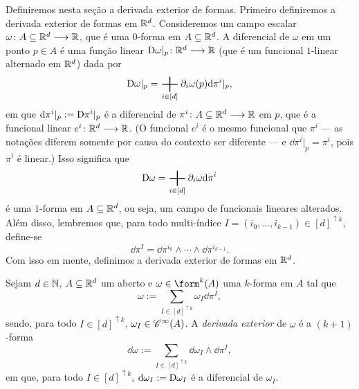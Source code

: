Definiremos nesta seção a derivada exterior de formas. Primeiro definiremos a derivada exterior de formas em $\mathbb{R}^d$. Consideremos um campo escalar $\omega\colon A \subseteq \mathbb{R}^d \longrightarrow \mathbb{R}$, que é uma $0$-forma em $A \subseteq \mathbb{R}^d$. A diferencial de $\omega$ em um ponto $p \in A$ é uma função linear $\mathrm{D} \omega|_p\colon \mathbb{R}^d \longrightarrow \mathbb{R}$ (que é um funcional $1$-linear alternado em $\mathbb{R}^d$) dada por
	\begin{equation*}
	\D \omega|_p = \sum_{i \in [d]} \partial_i \omega(p) \dd\pi^i|_p,
	\end{equation*}
em que $\mathrm{d}\pi^i|_p := \mathrm{D}\pi^i|_p$ é a diferencial de $\pi^i\colon A \subseteq \mathbb{R}^d \longrightarrow \mathbb{R}$ em $p$, que é a funcional linear $e^i\colon \mathbb{R}^d \longrightarrow \mathbb{R}$. (O funcional $e^i$ é o mesmo funcional que $\pi^i$ --- as notações diferem somente por causa do contexto ser diferente --- e $\dd\pi^i|_p=\pi^i$, pois $\pi^i$ é linear.) Isso significa que
	\begin{equation*}
	\D\omega = \sum_{i \in [d]} \partial_i \omega \dd\pi^i
	\end{equation*}
é uma $1$-forma em $A \subseteq \mathbb{R}^d$, ou seja, um campo de funcionais lineares alterados. Além disso, lembremos que, para todo multi-índice $I=(i_0,\ldots,i_{k-1}) \in [d]^{\uparrow k}$, define-se
	\begin{equation*}
	\dd\pi^I = \dd\pi^{i_0} \wedge \cdots \wedge \dd\pi^{i_{k-1}}.
	\end{equation*}
Com isso em mente, definimos a derivada exterior de formas em $\mathbb{R}^d$.

\begin{defi}
Sejam $d \in \mathbb{N}$, $A \subseteq \mathbb{R}^d$ um aberto e $\omega \in \form^k(A)$ uma $k$-forma em $A$ tal que
	\begin{equation*}
	\omega := \sum_{I \in [d]^{\uparrow k}} \omega_I \dd\pi^I,
	\end{equation*}
sendo, para todo $I \in [d]^{\uparrow k}$, $\omega_I \in \mathscr{C}^\infty(A)$. A \emph{derivada exterior} de $\omega$ é a $(k+1)$-forma
	\begin{equation*}
	\dd \omega := \sum_{I \in [d]^{\uparrow k}} \dd \omega_I \wedge \dd\pi^I,
	\end{equation*}
em que, para todo $I \in [d]^{\uparrow k}$, $\mathrm{d}\omega_I := \mathrm{D} \omega_I$ é a diferencial de $\omega_I$.
\end{defi}

